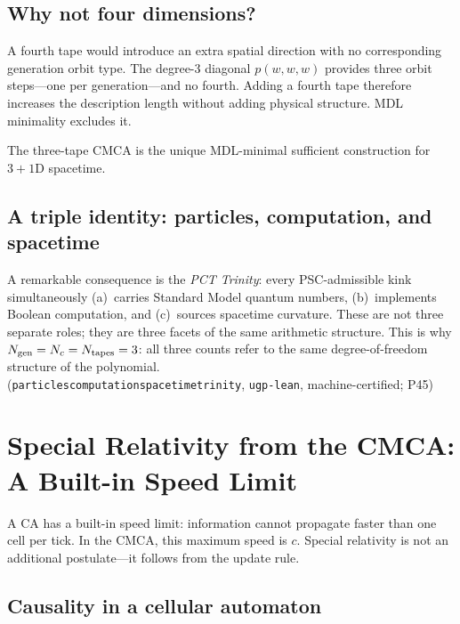 \documentclass[11pt,a4paper]{article}
\newcommand{\lean}[1]{\begingroup\def\_{\textunderscore\allowbreak}\texttt{#1}\endgroup}
\begin{document}
\subsection{Why not four dimensions?}

A fourth tape would introduce an extra spatial direction with no corresponding
generation orbit type.  The degree-3 diagonal $p(w,w,w)$ provides three orbit
steps---one per generation---and no fourth.  Adding a fourth tape therefore increases
the description length without adding physical structure.  MDL minimality excludes it.

The three-tape CMCA is the unique MDL-minimal sufficient construction for
$3{+}1$D spacetime.

\subsection{A triple identity: particles, computation, and spacetime}

A remarkable consequence is the \textit{PCT Trinity}: every PSC-admissible kink
simultaneously (a)~carries Standard Model quantum numbers, (b)~implements Boolean
computation, and (c)~sources spacetime curvature.  These are not three separate
roles; they are three facets of the same arithmetic structure.  This is why
$N_{\rm gen} = N_c = N_{\rm tapes} = 3$: all three counts refer to the
same degree-of-freedom structure of the polynomial.\\
(\lean{particles\_computation\_spacetime\_trinity}, \texttt{ugp-lean}, machine-certified; P45)

\section{Special Relativity from the CMCA: A Built-in Speed Limit}

\begin{tcolorbox}[colback=boxblue,colframe=blue!40!black,title=The key insight]
A CA has a built-in speed limit: information cannot propagate faster than one cell
per tick.  In the CMCA, this maximum speed is $c$.  Special relativity is not an
additional postulate---it follows from the update rule.
\end{tcolorbox}

\subsection{Causality in a cellular automaton}
\end{document}

